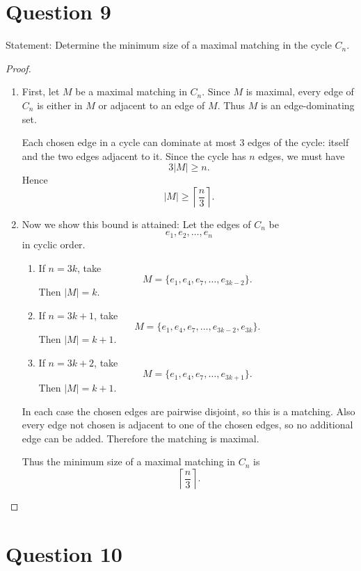 \documentclass[11pt]{article}
\begin{document}
\newpage

\section*{Question 9}

Statement: {Determine the minimum size of a maximal matching in the cycle $C_n$.}

\begin{proof}
~
\begin{enumerate}
    \item First, let $M$ be a maximal matching in $C_n$. Since $M$ is maximal, every edge of $C_n$ is either in $M$ or adjacent to an edge of $M$. Thus $M$ is an edge-dominating set.

Each chosen edge in a cycle can dominate at most $3$ edges of the cycle: itself and the two edges adjacent to it. Since the cycle has $n$ edges, we must have
\[
3|M|\ge n.
\]
Hence
\[
|M|\ge \left\lceil \frac{n}{3}\right\rceil.
\]

\item Now we show this bound is attained: Let the edges of $C_n$ be
\[
e_1,e_2,\dots,e_n
\]
in cyclic order.

\begin{enumerate}
\item If $n=3k$, take
\[
M=\{e_1,e_4,e_7,\dots,e_{3k-2}\}.
\]
Then $|M|=k$.

\item If $n=3k+1$, take
\[
M=\{e_1,e_4,e_7,\dots,e_{3k-2},e_{3k}\}.
\]
Then $|M|=k+1$.

\item If $n=3k+2$, take
\[
M=\{e_1,e_4,e_7,\dots,e_{3k+1}\}.
\]
Then $|M|=k+1$.
\end{enumerate}

In each case the chosen edges are pairwise disjoint, so this is a matching. Also every edge not chosen is adjacent to one of the chosen edges, so no additional edge can be added. Therefore the matching is maximal.

Thus the minimum size of a maximal matching in $C_n$ is
\[
\left\lceil \frac{n}{3}\right\rceil.
\]
\end{enumerate}
\end{proof}

\newpage

\section*{Question 10}
\end{document}
